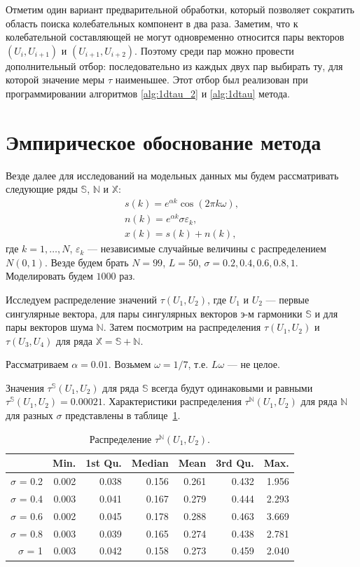 \documentclass[specialist,
               substylefile = spbu.rtx,
               subf,href,colorlinks=true, 12pt]{disser}
\begin{document}
Отметим один вариант предварительной обработки, который позволяет сократить область поиска колебательных компонент в два раза.
Заметим, что к колебательной составляющей не могут одновременно относится пары векторов $(U_i, U_{i+1})$ и $(U_{i+1}, U_{i+2})$. Поэтому среди пар можно провести дополнительный отбор: последовательно из каждых двух пар выбирать ту, для которой значение меры $\tau$ наименьшее. Этот отбор был реализован при программировании алгоритмов \ref{alg:1dtau_2} и \ref{alg:1dtau} метода. 

\section{Эмпирическое обоснование метода}
\label{sec:tau_study}
Везде далее для исследований на модельных данных мы будем рассматривать следующие ряды $\mathbb{S}$, $\mathbb{N}$ и $\mathbb{X}$:
\begin{gather} \label{eq:series_S_N}
s(k) =  e^{\alpha k} \cos(2\pi k \omega), \\  \label{eq:series_N_N}
n(k) =  e^{\alpha k} \sigma \varepsilon_k, \\ \label{eq:series_X_N}
x(k) = s(k) + n(k),
\end{gather}
где $k=1,\ldots,N$, $\varepsilon_k$ --- независимые случайные величины с распределением $N(0,1)$. Везде будем брать $N = 99$, $L = 50$, $\sigma = 0.2, 0.4, 0.6, 0.8, 1$. Моделировать будем $1000$ раз.

Исследуем распределение
 значений $\tau(U_1, U_2)$, где $U_1$ и $U_2$ --- первые сингулярные вектора, для пары сингулярных векторов э-м гармоники $\mathbb{S}$ и для пары векторов шума $\mathbb{N}$. Затем посмотрим на распределения  $\tau(U_1, U_2)$ и  $\tau(U_3, U_4)$ для ряда $\mathbb{X} = \mathbb{S} + \mathbb{N}$.

Рассматриваем $\alpha = 0.01$. Возьмем $\omega = 1/7$, т.е. $L\omega$ --- не целое.

Значения $\tau^{\mathbb{S}}(U_1, U_2)$  для ряда $\mathbb{S}$ всегда будут одинаковыми и равными  $\tau^{\mathbb{S}}(U_1, U_2) = 0.00021$. Характеристики распределения $\tau^{\mathbb{N}}(U_1, U_2)$ для ряда $\mathbb{N}$ для разных $\sigma$ представлены в таблице~\ref{tab:model_dist_tau1_sig_notint}.

\begin{table}[hhh!]
\caption{Распределение $\tau^{\mathbb{N}}(U_1, U_2)$.}
\centering
\begin{tabular}{rrrrrrr}
  \hline
 & Min. & 1st Qu. & Median & Mean & 3rd Qu. & Max. \\
  \hline
$\sigma$ = 0.2 & 0.002 & 0.038 & 0.156 & 0.261 & 0.432 & 1.956 \\ 
  $\sigma$ = 0.4 & 0.003 & 0.041 & 0.167 & 0.279 & 0.444 & 2.293 \\ 
  $\sigma$ = 0.6 & 0.002 & 0.045 & 0.178 & 0.288 & 0.463 & 3.669 \\ 
  $\sigma$ = 0.8 & 0.003 & 0.039 & 0.165 & 0.274 & 0.438 & 2.781 \\ 
  $\sigma$ = 1 & 0.003 & 0.042 & 0.158 & 0.273 & 0.459 & 2.040 \\ 
   \hline
\end{tabular}
\label{tab:model_dist_tau1_sig_notint}
\end{table}
\end{document}
